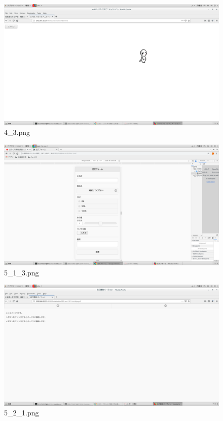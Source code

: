 \documentclass[a4j]{jarticle}
\begin{document}
  \vspace{1cm}
  \begin{figure}[htbp]
    \centering
    \includegraphics[width=13cm]{../webapp/png/4_3.png}
    \caption{4\_3.png}
  \end{figure}

  \vspace{1cm}
  \begin{figure}[htbp]
    \centering
    \includegraphics[width=13cm]{../webapp/png/5_1_3.png}
    \caption{5\_1\_3.png}
  \end{figure}

  \vspace{1cm}
  \begin{figure}[htbp]
    \centering
    \includegraphics[width=13cm]{../webapp/png/5_2_1.png}
    \caption{5\_2\_1.png}
  \end{figure}
\end{document}
